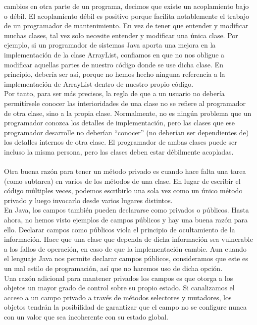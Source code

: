 \documentclass[11pt,a4paper]{article}
\begin{document}
cambios en otra parte de un programa, decimos que existe un acoplamiento bajo o débil.
El acoplamiento débil es positivo porque facilita notablemente el trabajo de un programador de
mantenimiento. En vez de tener que entender y modificar muchas clases, tal vez solo necesite
entender y modificar una única clase. Por ejemplo, si un programador de sistemas Java aporta una
mejora en la implementación de la clase ArrayList, confiamos en que no nos obligue a modificar
aquellas partes de nuestro código donde se use dicha clase. En principio, debería ser así, porque
no hemos hecho ninguna referencia a la implementación de ArrayList dentro de nuestro propio
código.\\
Por tanto, para ser más precisos, la regla de que a un usuario no debería permitírsele conocer
las interioridades de una clase no se refiere al programador de otra clase, sino a la propia clase.
Normalmente, no es ningún problema que un programador conozca los detalles de implementación,
pero las clases que ese programador desarrolle no deberían “conocer” (no deberían ser
dependientes de) los detalles internos de otra clase. El programador de ambas clases puede
ser incluso la misma persona, pero las clases deben estar débilmente acopladas.\\
\\
Otra buena razón para tener un método privado es cuando hace falta una tarea (como subtarea) en
varios de los métodos de una clase. En lugar de escribir el código múltiples veces, podemos escribirlo
una sola vez como un único método privado y luego invocarlo desde varios lugares distintos.\\
En Java, los campos también pueden declararse como privados o públicos. Hasta ahora, no hemos
visto ejemplos de campos públicos y hay una buena razón para ello. Declarar campos como públicos
viola el principio de ocultamiento de la información. Hace que una clase que dependa de dicha
información sea vulnerable a los fallos de operación, en caso de que la implementación cambie.
Aun cuando el lenguaje Java nos permite declarar campos públicos, consideramos que este es un
mal estilo de programación, así que no haremos uso de dicha opción.\\
Una razón adicional para mantener privados los campos es que otorga a los objetos un mayor
grado de control sobre su propio estado. Si canalizamos el acceso a un campo privado a través de
métodos selectores y mutadores, los objetos tendrán la posibilidad de garantizar que el campo no
se configure nunca con un valor que sea incoherente con su estado global.
\end{document}
